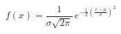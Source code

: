 \documentclass[12pt]{article}
\begin{document}
\begin{equation*}
  f(x) = \frac{1}{\sigma \sqrt{2\pi}} \, e^{\displaystyle -\frac{1}{2} \left( \frac{x - \mu}{\sigma} \right)^{2}}
\end{equation*}
\end{document}
